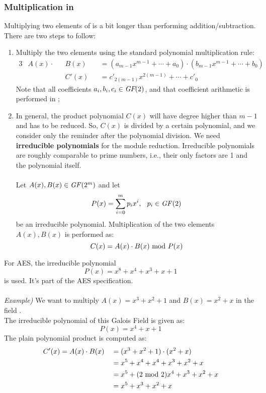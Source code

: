 \newpage
\hypertarget{multGF}{\subsubsection{Multiplication in }}
Multiplying two elements of  is a bit longer than performing addition/subtraction. There are two steps to follow:
\begin{enumerate}
    \item Multiply the two elements using the standard polynomial multiplication rule:
    \begin{alignat*}{3}
        &A(x)\cdot &&B(x)&&=(a_{m-1}x^{m-1}+\cdots+a_0)\cdot(b_{m-1}x^{m-1}+\cdots+b_0)\\
        &          &&C'(x)&&=c'_{2(m-1)}x^{2(m-1)}+\cdots+c'_0
    \end{alignat*}
    Note that all coefficients $a_i,b_i,c_i\in\textit{GF}(2)$, and that coefficient arithmetic is performed in ;
    \item In general, the product polynomial $C(x)$ will have degree higher than $m-1$ and has to be reduced. So, $C(x)$ is divided by a certain polynomial, and we consider only the reminder after the polynomial division. We need \textbf{irreducible polynomials} for the module reduction. Irreducible polynomials are roughly comparable to prime numbers, i.e., their only factors are 1 and the polynomial itself.\\\\
    Let $A(x),B(x)\in\text{\textit{GF}($2^m$)}$ and let
    $$P(x)=\displaystyle\sum_{i=0}^mp_ix^i,\hspace{0.25cm}p_i\in\text{\textit{GF}(2)}$$
    be an irreducible polynomial. Multiplication of the two elements $A(x),B(x)$ is performed as:
    $$C(x)=A(x)\cdot B(x)\text{ mod } P(x)$$
\end{enumerate}
For AES, the irreducible polynomial
$$P(x)=x^8+x^4+x^3+x+1$$
is used. It's part of the AES specification.\\\\
\textit{Example)} We want to multiply $A(x)=x^3+x^2+1$ and $B(x)=x^2+x$ in the field .\\
The irreducible polynomial of this Galois Field is given as:
$$P(x)=x^4+x+1$$
The plain polynomial product is computed as:
\begin{alignat*}{2}
    &C'(x)=A(x)\cdot B(x)&&=(x^3+x^2+1)\cdot(x^2+x)\\
    &                    &&=x^5+x^4+x^4+x^3+x^2+x\\
    &                    &&=x^5+(2\text{ mod }2)x^4+x^3+x^2+x\\
    &                    &&=x^5+x^3+x^2+x
\end{alignat*}
